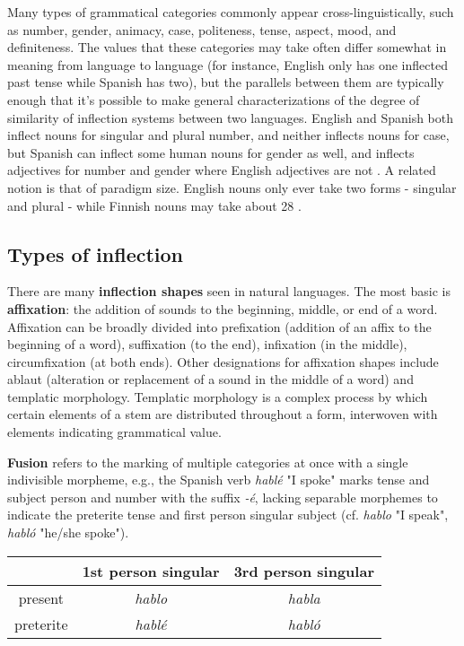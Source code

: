 Many types of grammatical categories commonly appear cross-linguistically, such as number, gender, animacy, case, politeness, tense, aspect, mood, and definiteness. The values that these categories may take often differ somewhat in meaning from language to language (for instance, English only has one inflected past tense while Spanish has two), but the parallels between them are typically enough that it's possible to make general characterizations of the degree of similarity of inflection systems between two languages. English and Spanish both inflect nouns for singular and plural number, and neither inflects nouns for case, but Spanish can inflect some human nouns for gender as well, and inflects adjectives for number and gender where English adjectives are not \parencite{Hogan2010}. A related notion is that of paradigm size. English nouns only ever take two forms - singular and plural - while Finnish nouns may take about 28 \parencite{Wiktionary}.

\subsection{Types of inflection}

There are many \textbf{inflection shapes} seen in natural languages. The most basic is \textbf{affixation}: the addition of sounds to the beginning, middle, or end of a word. Affixation can be broadly divided into prefixation (addition of an affix to the beginning of a word), suffixation (to the end), infixation (in the middle), circumfixation (at both ends). Other designations for affixation shapes include ablaut (alteration or replacement of a sound in the middle of a word) and templatic morphology. Templatic morphology is a complex process by which certain elements of a stem are distributed throughout a form, interwoven with elements indicating grammatical value. 

\textbf{Fusion} refers to the marking of multiple categories at once with a single indivisible morpheme, e.g., the Spanish verb \textit{hablé} "I spoke" marks tense and subject person and number with the suffix \textit{-é}, lacking separable morphemes to indicate the preterite tense and first person singular subject (cf. \textit{hablo} "I speak", \textit{habló} "he/she spoke"). 

\begin{center}
\begin{tabular}{|c||c|c|}
\hline
& 1st person singular & 3rd person singular \\
\hline \hline
present & \textit{hablo} & \textit{habla} \\
\hline 
preterite & \textit{hablé} & \textit{habló} \\
\hline
\end{tabular}
\end{center}

